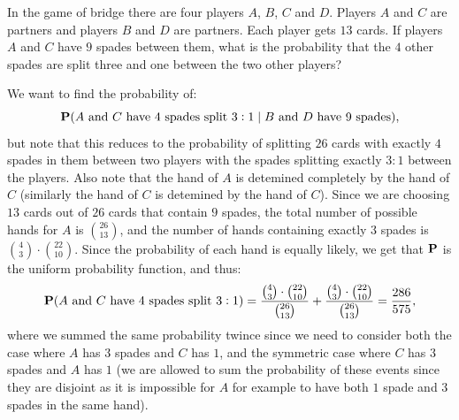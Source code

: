 \documentclass[11pt,a4paper]{article}
\begin{document}
\begin{exercise}
  In the game of bridge there are four players $A$, $B$, $C$ and $D$.
  Players $A$ and $C$ are partners and players $B$ and $D$ are partners.
  Each player gets $13$ cards.
  If players $A$ and $C$ have $9$ spades between them,
  what is the probability that the $4$ other spades are split three
  and one between the two other players?
\end{exercise}
\begin{solution}
  We want to find the probability of:
  \[
    \mathbf{P}(A \text{ and } C \text{ have $4$ spades split $3:1$} \mid
      \text{$B$ and $D$ have $9$ spades}),
  \]
  but note that this reduces to the probability of splitting $26$
  cards with exactly $4$ spades in them between two players with the spades
  splitting exactly $3 : 1$ between the players.
  Also note that the hand of $A$ is detemined completely by the hand of $C$
  (similarly the hand of $C$ is detemined by the hand of $C$).
  Since we are choosing $13$ cards out of $26$ cards that contain $9$
  spades, the total number of possible hands for $A$ is $\binom{26}{13}$,
  and the number of hands containing exactly $3$ spades is
  $\binom{4}{3} \cdot \binom{22}{10}$.
  Since the probability of each hand is equally likely,
  we get that $\mathbf{P}$ is the uniform probability function,
  and thus:
  \[
    \mathbf{P}(A \text{ and } C \text{ have $4$ spades split $3:1$}) =
    \frac{\binom{4}{3} \cdot \binom{22}{10}}{\binom{26}{13}} +
    \frac{\binom{4}{3} \cdot \binom{22}{10}}{\binom{26}{13}} =
    \frac{286}{575},
  \]
  where we summed the same probability twince
  since we need to consider both the case
  where $A$ has $3$ spades and $C$ has $1$, and the symmetric case where
  $C$ has $3$ spades and $A$ has $1$ (we are allowed to sum the probability
  of these events since they are disjoint as it is impossible for $A$
  for example to have both $1$ spade and $3$ spades in the same hand).
\end{solution}
\end{document}
